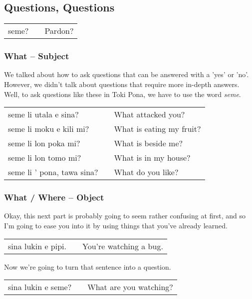 \subsection*{Questions, Questions}
%
\begin{supertabular}{p{5,5cm}|ll}
seme? && Pardon? \\
\end{supertabular} 
%
\subsubsection*{What -- Subject}
%
We talked about how to ask questions that can be answered with a 'yes' or 'no'. 
However, we didn't talk about questions that require more in-depth answers. 
Well, to ask questions like these in Toki Pona, we have to use the word \textit{seme}. 

\begin{supertabular}{p{5,5cm}|ll}
seme li utala e sina? && What attacked you? \\
seme li moku e kili mi? && What is eating my fruit? \\
seme li lon poka mi? && What is beside me? \\
seme li lon tomo mi? && What is in my house? \\
seme li ' pona, tawa sina? && What do you like? \\ 
\end{supertabular} 
%
\subsubsection*{What / Where -- Object}
%
Okay, this next part is probably going to seem rather confusing at first, and so I'm going to ease you into it by using things that you've already learned. 

\begin{supertabular}{p{5,5cm}|ll}
sina lukin e pipi. && You're watching a bug. \\
\end{supertabular} 

Now we're going to turn that sentence into a question. 

\begin{supertabular}{p{5,5cm}|ll}
sina lukin e seme? && What are you watching? \\
\end{supertabular} 


